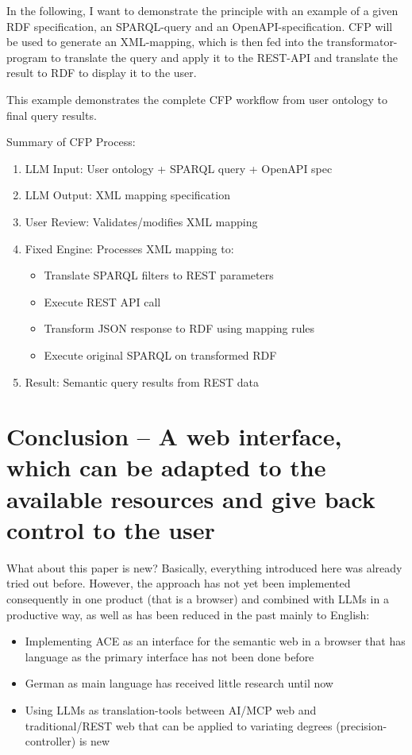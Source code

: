 \documentclass[12pt,a4paper]{article}
\begin{document}
In the following, I want to demonstrate the principle with an example of a given RDF specification, an SPARQL-query and an OpenAPI-specification. CFP will be used to generate an XML-mapping, which is then fed into the transformator-program to translate the query and apply it to the REST-API and translate the result to RDF to display it to the user.

This example demonstrates the complete CFP workflow from user ontology to final query results.

Summary of CFP Process:
\begin{enumerate}
    \item LLM Input: User ontology + SPARQL query + OpenAPI spec
    \item LLM Output: XML mapping specification
    \item User Review: Validates/modifies XML mapping
    \item Fixed Engine: Processes XML mapping to:
    \begin{itemize}
        \item Translate SPARQL filters to REST parameters
        \item Execute REST API call
        \item Transform JSON response to RDF using mapping rules
        \item Execute original SPARQL on transformed RDF
    \end{itemize}
    \item Result: Semantic query results from REST data
\end{enumerate}

\section{Conclusion -- A web interface, which can be adapted to the available resources and give back control to the user}

What about this paper is new? Basically, everything introduced here was already tried out before. However, the approach has not yet been implemented consequently in one product (that is a browser) and combined with LLMs in a productive way, as well as has been reduced in the past mainly to English:
\begin{itemize}
    \item Implementing ACE as an interface for the semantic web in a browser that has language as the primary interface has not been done before
    \item German as main language has received little research until now
    \item Using LLMs as translation-tools between AI/MCP web and traditional/REST web that can be applied to variating degrees (precision-controller) is new
\end{itemize}
\end{document}
